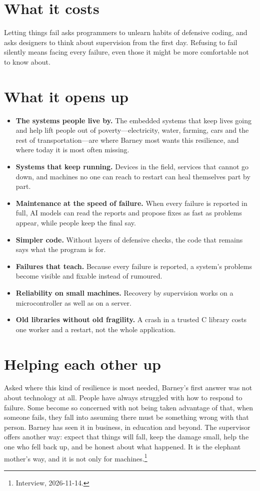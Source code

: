 \section{What it costs}

Letting things fail asks programmers to unlearn habits of defensive coding,
and asks designers to think about supervision from the first day. Refusing to
fail silently means facing every failure, even those it might be more
comfortable not to know about.

\section{What it opens up}

\begin{itemize}
  \item \textbf{The systems people live by.} The embedded systems that keep
        lives going and help lift people out of poverty---electricity, water,
        farming, cars and the rest of transportation---are where Barney most
        wants this resilience, and where today it is most often missing.
  \item \textbf{Systems that keep running.} Devices in the field, services
        that cannot go down, and machines no one can reach to restart can heal
        themselves part by part.
  \item \textbf{Maintenance at the speed of failure.} When every failure is
        reported in full, AI models can read the reports and propose fixes as
        fast as problems appear, while people keep the final say.
  \item \textbf{Simpler code.} Without layers of defensive checks, the code
        that remains says what the program is for.
  \item \textbf{Failures that teach.} Because every failure is reported, a
        system's problems become visible and fixable instead of rumoured.
  \item \textbf{Reliability on small machines.} Recovery by supervision
        works on a microcontroller as well as on a server.
  \item \textbf{Old libraries without old fragility.} A crash in a trusted
        C library costs one worker and a restart, not the whole
        application.
\end{itemize}

\section{Helping each other up}

Asked where this kind of resilience is most needed, Barney's first answer was
not about technology at all. People have always struggled with how to respond to
failure. Some become so concerned with not being taken advantage of that, when
someone fails, they fall into assuming there must be something wrong with that
person. Barney has seen it in business, in education and beyond. The supervisor
offers another way: expect that things will fall, keep the damage small, help
the one who fell back up, and be honest about what happened. It is the elephant
mother's way, and it is not only for machines.\footnote{Interview, 2026-11-14.}
